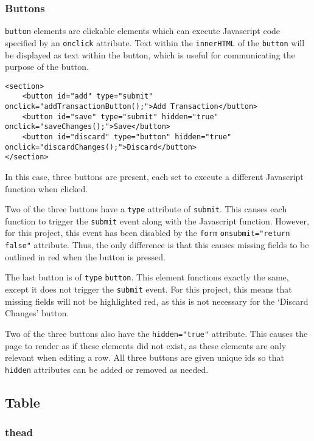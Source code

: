 \documentclass[letterpaper]{article}
\begin{document}
\subsubsection{Buttons}

\lstinline{button} elements are clickable elements which can execute Javascript code specified by an \lstinline{onclick} attribute.
Text within the \lstinline{innerHTML} of the \lstinline{button} will be displayed as text within the button, which is useful for communicating the purpose of the button.

\begin{lstlisting}[firstnumber=49]
<section>
    <button id="add" type="submit" onclick="addTransactionButton();">Add Transaction</button>
    <button id="save" type="submit" hidden="true" onclick="saveChanges();">Save</button>
    <button id="discard" type="button" hidden="true" onclick="discardChanges();">Discard</button>
</section>
\end{lstlisting}

In this case, three buttons are present, each set to execute a different Javascript function when clicked.

Two of the three buttons have a \lstinline{type} attribute of \lstinline{submit}.
This causes each function to trigger the \lstinline{submit} event along with the Javascript function.
However, for this project, this event has been disabled by the \lstinline{form} \lstinline{onsubmit="return false"} attribute.
Thus, the only difference is that this causes missing fields to be outlined in red when the button is pressed.

The last button is of \lstinline{type} \lstinline{button}.
This element functions exactly the same, except it does not trigger the \lstinline{submit} event.
For this project, this means that missing fields will not be highlighted red, as this is not necessary for the `Discard Changes' button.

Two of the three buttons also have the \lstinline{hidden="true"} attribute.
This causes the page to render as if these elements did not exist, as these elements are only relevant when editing a row.
All three buttons are given unique ids so that \lstinline{hidden} attributes can be added or removed as needed.

\subsection{Table}

\subsubsection{thead}
\end{document}
